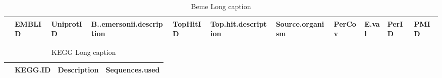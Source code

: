 \begin{table}[tbp]
\centering
\begin{tabular}{rllllllllll}
  \hline
\hline
 & EMBLID & UniprotID & B..emersonii.description & TopHitID & Top.hit.description & Source.organism & PerCov & E.val & PerID & PMID \\ 
  \hline
\hline
\hline
\end{tabular}
\caption[Beme short caption]{Beme Long caption} 
\label{tab:ChClat_BemeVerify}
\end{table}
\begin{table}[tbp]
\centering
\begin{tabular}{rlll}
  \hline
\hline
 & KEGG.ID & Description & Sequences.used \\ 
  \hline
\hline
\hline
\end{tabular}
\caption[KEGG short caption]{KEGG Long caption} 
\label{tab:ChClat_KEGGHMM}
\end{table}
